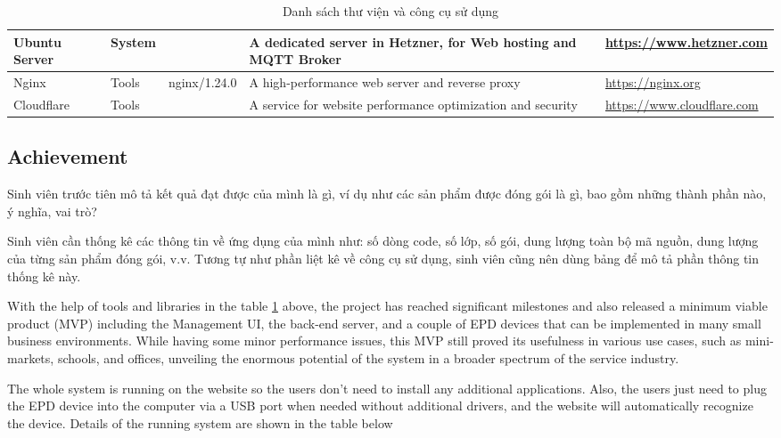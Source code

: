 \documentclass[../Main.tex]{subfiles}
\begin{document}
\begin{table}[H]
\begin{tabular}{| m{3cm} | m{1cm} | m{1.4cm} | m{4cm} | m{4cm} |}
        Ubuntu Server                           & System        &                   & A dedicated server in Hetzner, for Web hosting and MQTT Broker    & \url{https://www.hetzner.com}                                     \\ \hline
        Nginx                                   & Tools         & nginx/1.24.0      & A high-performance web server and reverse proxy                   & \url{https://nginx.org}                                           \\ \hline
        Cloudflare                              & Tools         &                   & A service for website performance optimization and security       & \url{https://www.cloudflare.com}                                  \\ \hline
    \end{tabular}
    \caption{Danh sách thư viện và công cụ sử dụng}
    \label{fig:table_tools}
\end{table}

\subsection{Achievement}
Sinh viên trước tiên mô tả kết quả đạt được của mình là gì, ví dụ như các sản phẩm được đóng gói là gì, bao gồm những thành phần nào, ý nghĩa, vai trò?

Sinh viên cần thống kê các thông tin về ứng dụng của mình như: số dòng code, số lớp, số gói, dung lượng toàn bộ mã nguồn, dung lượng của từng sản phẩm đóng gói, v.v. Tương tự như phần liệt kê về công cụ sử dụng, sinh viên cũng nên dùng bảng để mô tả phần thông tin thống kê này.

With the help of tools and libraries in the table \ref{fig:table_tools} above, the project has reached significant milestones and also released a minimum viable product (MVP) including the Management UI, the back-end server, and a couple of EPD devices that can be implemented in many small business environments. While having some minor performance issues, this MVP still proved its usefulness in various use cases, such as mini-markets, schools, and offices, unveiling the enormous potential of the system in a broader spectrum of the service industry.

The whole system is running on the website so the users don't need to install any additional applications. Also, the users just need to plug the EPD device into the computer via a USB port when needed without additional drivers, and the website will automatically recognize the device. Details of the running system are shown in the table below
\end{document}

